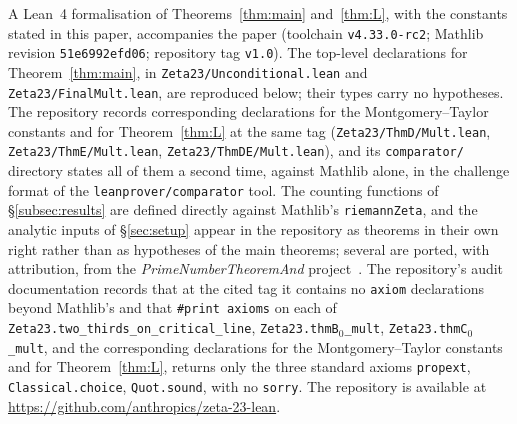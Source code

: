 \documentclass[11pt]{amsart}
\newcommand{\leanToolchain}{v4.33.0-rc2}
\newcommand{\mathlibRev}{51e6992efd06}
\newcommand{\repoTag}{v1.0}
\theoremstyle{definition}
\theoremstyle{remark}
\numberwithin{equation}{section}
\begin{document}
A Lean~4 formalisation of Theorems~\ref{thm:main} and~\ref{thm:L}, with the constants stated in this paper, accompanies the paper (toolchain \texttt{\leanToolchain}; Mathlib revision \texttt{\mathlibRev}; repository tag \texttt{\repoTag}). The top-level declarations for Theorem~\ref{thm:main}, in \texttt{Zeta23/Unconditional.lean} and \texttt{Zeta23/FinalMult.lean}, are reproduced below; their types carry no hypotheses. The repository records corresponding declarations for the Montgomery--Taylor constants and for Theorem~\ref{thm:L} at the same tag (\texttt{Zeta23/ThmD/Mult.lean}, \texttt{Zeta23/ThmE/Mult.lean}, \texttt{Zeta23/ThmDE/Mult.lean}), and its \texttt{comparator/} directory states all of them a second time, against Mathlib alone, in the challenge format of the \texttt{leanprover/comparator} tool. The counting functions of \S\ref{subsec:results} are defined directly against Mathlib's \texttt{riemannZeta}, and the analytic inputs of \S\ref{sec:setup} appear in the repository as theorems in their own right rather than as hypotheses of the main theorems; several are ported, with attribution, from the \emph{PrimeNumberTheoremAnd} project~\cite{PNTplus}. The repository's audit documentation records that at the cited tag it contains no \texttt{axiom} declarations beyond Mathlib's and that \verb|#print axioms| on each of \texttt{Zeta23.two\_thirds\_on\_critical\_line}, \texttt{Zeta23.thmB\ensuremath{_0}\_mult}, \texttt{Zeta23.thmC\ensuremath{_0}\_mult}, and the corresponding declarations for the Montgomery--Taylor constants and for Theorem~\ref{thm:L}, returns only the three standard axioms \texttt{propext}, \texttt{Classical.choice}, \texttt{Quot.sound}, with no \texttt{sorry}. The repository is available at \url{https://github.com/anthropics/zeta-23-lean}.
\end{document}
